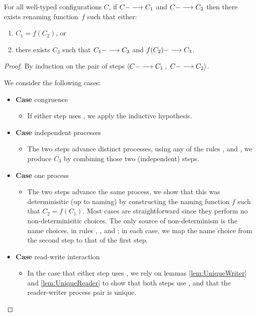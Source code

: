 \begin{theorem}
For all well-typed configurations $C$,
%
 if $C ---> C_1$ 
and $C ---> C_2$ 
then 
there exists renaming function~$f$ 
such that either:
\begin{enumerate}
\item %
$C_1 = f(C_2)$,
or
\item there exists $C_3$ such that $C_1 ---> C_3$ and $f(C_2) ---> C_3$.
\end{enumerate}
\begin{proof}
   By induction on the pair of steps 
   $\left< C ---> C_1\right.$, 
   $\left.C ---> C_2 \right>$.

   We consider the following cases:
   \begin{itemize}[leftmargin=*]
   \item[] \textbf{Case} congruence
     \begin{itemize}[leftmargin=*]
       \item[] If either step uses , we apply
     the inductive hypothesis.
     \end{itemize}     

   \item[] \textbf{Case} independent processes
     \begin{itemize}[leftmargin=*]
       \item[] The two steps advance distinct processes, using any of the rules
         ,  and , we produce $C_3$ by combining
         those two (independent) steps.
     \end{itemize}


   \item[] \textbf{Case} one process
     \begin{itemize}[leftmargin=*]
       \item[] The two steps advance the same process, we show that this was
         determinisitic (up to naming) by constructing the naming function $f$
         such that $C_2 = f(C_1)$.  Most cases are straightforward since they
         perform no non-determinisitic choices.  The only source of
         non-determinism is the name choices, in rules , ,
         and ; in each case, we map the name choice from the second
         step to that of the first step.
     \end{itemize}


   \item[] \textbf{Case} read-write interaction
     \begin{itemize}[leftmargin=*]
       \item[] In the case that either step uses , we rely on lemmas
         \ref{lem:UniqueWriter} and \ref{lem:UniqueReader} to show that both
         steps use , and that the reader-writer process pair is unique.
     \end{itemize}


\end{itemize}
\end{proof}
\end{theorem}
